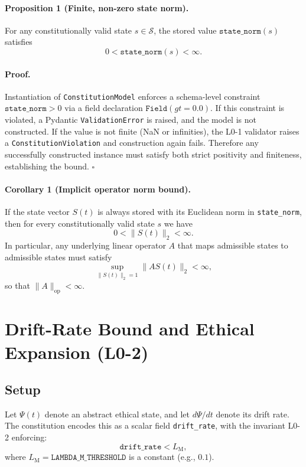 \documentclass[11pt]{article}
\begin{document}
\paragraph{Proposition 1 (Finite, non-zero state norm).}
For any constitutionally valid state \(s\in\mathcal{S}\), the stored value \(\texttt{state\_norm}(s)\) satisfies
\[
  0 < \texttt{state\_norm}(s) < \infty.
\]

\paragraph{Proof.}
Instantiation of \texttt{ConstitutionModel} enforces a schema-level constraint \(\texttt{state\_norm} > 0\) via a field declaration \(\texttt{Field}(gt=0.0).\)\cite{cite:40}
If this constraint is violated, a Pydantic \texttt{ValidationError} is raised, and the model is not constructed.\cite{cite:40, cite:42}
If the value is not finite (NaN or infinities), the L0-1 validator raises a \texttt{ConstitutionViolation} and construction again fails.\cite{cite:40, cite:42}
Therefore any successfully constructed instance must satisfy both strict positivity and finiteness, establishing the bound. \(\square\)

\paragraph{Corollary 1 (Implicit operator norm bound).}
If the state vector \(S(t)\) is always stored with its Euclidean norm in \texttt{state\_norm}, then for every constitutionally valid state \(s\) we have
\[
  0 < \lVert S(t)\rVert_2 < \infty.
\]
In particular, any underlying linear operator \(A\) that maps admissible states to admissible states must satisfy
\[
  \sup_{\lVert S(t)\rVert_2 = 1} \lVert A S(t)\rVert_2 < \infty,
\]
so that \(\lVert A\rVert_{\mathrm{op}} < \infty\).

\section{Drift-Rate Bound and Ethical Expansion (L0-2)}

\subsection{Setup}

Let \(\Psi(t)\) denote an abstract ethical state, and let \(d\Psi/dt\) denote its drift rate. The constitution encodes this as a scalar field \texttt{drift\_rate}, with the invariant L0-2 enforcing:\cite{cite:40,cite:42}
\[
  \texttt{drift\_rate} < L_{\mathrm{M}},
\]
where \(L_{\mathrm{M}} = \texttt{LAMBDA\_M\_THRESHOLD}\) is a constant (e.g., \(0.1\)).\cite{cite:40}
\end{document}
